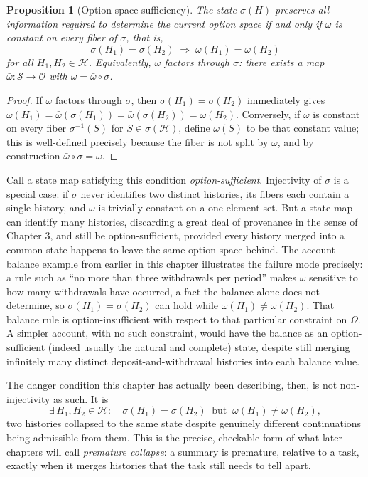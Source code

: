 \documentclass[11pt]{book}
\newtheorem{proposition}[theorem]{Proposition}
\begin{document}
\begin{proposition}[Option-space sufficiency]
\label{prop:option-sufficiency}
The state $\sigma(H)$ preserves all information required to determine the current option space if and only if $\omega$ is constant on every fiber of $\sigma$, that is,
\[
\sigma(H_1)=\sigma(H_2) \;\Longrightarrow\; \omega(H_1)=\omega(H_2)
\]
for all $H_1,H_2 \in \mathcal H$. Equivalently, $\omega$ factors through $\sigma$: there exists a map $\bar\omega:\mathcal S\to\mathcal O$ with $\omega = \bar\omega \circ \sigma$.
\end{proposition}
\begin{proof}
If $\omega$ factors through $\sigma$, then $\sigma(H_1)=\sigma(H_2)$ immediately gives $\omega(H_1)=\bar\omega(\sigma(H_1))=\bar\omega(\sigma(H_2))=\omega(H_2)$. Conversely, if $\omega$ is constant on every fiber $\sigma^{-1}(S)$ for $S\in\sigma(\mathcal H)$, define $\bar\omega(S)$ to be that constant value; this is well-defined precisely because the fiber is not split by $\omega$, and by construction $\bar\omega\circ\sigma=\omega$.
\end{proof}

Call a state map satisfying this condition \emph{option-sufficient}. Injectivity of $\sigma$ is a special case: if $\sigma$ never identifies two distinct histories, its fibers each contain a single history, and $\omega$ is trivially constant on a one-element set. But a state map can identify many histories, discarding a great deal of provenance in the sense of Chapter 3, and still be option-sufficient, provided every history merged into a common state happens to leave the same option space behind. The account-balance example from earlier in this chapter illustrates the failure mode precisely: a rule such as ``no more than three withdrawals per period'' makes $\omega$ sensitive to how many withdrawals have occurred, a fact the balance alone does not determine, so $\sigma(H_1)=\sigma(H_2)$ can hold while $\omega(H_1)\ne\omega(H_2)$. That balance rule is option-insufficient with respect to that particular constraint on $\Omega$. A simpler account, with no such constraint, would have the balance as an option-sufficient (indeed usually the natural and complete) state, despite still merging infinitely many distinct deposit-and-withdrawal histories into each balance value.

The danger condition this chapter has actually been describing, then, is not non-injectivity as such. It is
\[
\exists\, H_1,H_2 \in \mathcal H:\quad \sigma(H_1)=\sigma(H_2) \ \text{ but } \ \omega(H_1)\ne\omega(H_2),
\]
two histories collapsed to the same state despite genuinely different continuations being admissible from them. This is the precise, checkable form of what later chapters will call \emph{premature collapse}: a summary is premature, relative to a task, exactly when it merges histories that the task still needs to tell apart.
\end{document}
